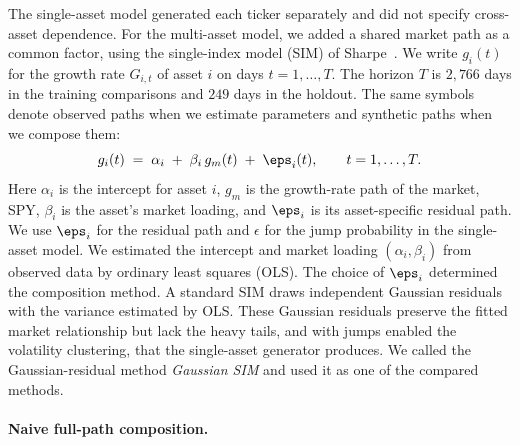 
The single-asset model generated each ticker separately and did not
specify cross-asset dependence. For the multi-asset model, we added a
shared market path as a common factor, using the single-index model
(SIM) of Sharpe~\cite{sharpe1963}. We write $g_i(t)$ for the growth rate $G_{i,t}$ of asset $i$ on days
$t=1,\dots,T$. The horizon $T$ is $2{,}766$ days in the training
comparisons and $249$ days in the holdout. The same symbols denote
observed paths when we estimate parameters and synthetic paths when
we compose them:
\begin{equation}
  g_i(t) \;=\; \alpha_i \;+\; \beta_i\, g_m(t) \;+\; \eps_i(t),
  \qquad t = 1,\dots,T.
  \label{eq:sim-composition}
\end{equation}
Here $\alpha_i$ is the intercept for asset $i$, $g_m$ is the
growth-rate path of the market, SPY, $\beta_i$ is the asset's market
loading, and $\eps_i$ is its asset-specific residual path. We use
$\eps_i$ for the residual path and $\epsilon$ for the jump probability
in the single-asset model. We estimated the intercept and market
loading $(\alpha_i,\beta_i)$ from observed data by ordinary least
squares (OLS). The choice of $\eps_i$ determined the composition
method. A standard SIM draws independent Gaussian residuals with the
variance estimated by OLS. These Gaussian residuals preserve the fitted market relationship but
lack the heavy tails, and with jumps enabled the volatility
clustering, that the single-asset generator produces. We called the Gaussian-residual method
\emph{Gaussian SIM} and used it as one of the compared methods.

\paragraph{Naive full-path composition.}

